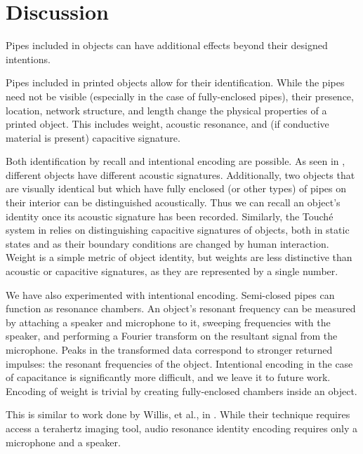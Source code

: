 \section{Discussion}

Pipes included in objects can have additional effects beyond their designed intentions.

Pipes included in printed objects allow for their identification.  While the pipes need not be visible (especially in the case of fully-enclosed pipes), their presence, location, network structure, and length change the physical properties of a printed object.  This includes weight, acoustic resonance, and (if conductive material is present) capacitive signature.

Both identification by recall and intentional encoding are possible.  As seen in \cite{Ono-touchandactivate}, different objects have different acoustic signatures.  Additionally, two objects that are visually identical but which have fully enclosed (or other types) of pipes on their interior can be distinguished acoustically.  Thus we can recall an object's identity once its acoustic signature has been recorded.  Similarly, the Touch\'{e} system in \cite{Sato-touche} relies on distinguishing capacitive signatures of objects, both in static states and as their boundary conditions are changed by human interaction.  Weight is a simple metric of object identity, but weights are less distinctive than acoustic or capacitive signatures, as they are represented by a single number.

We have also experimented with intentional encoding.  Semi-closed pipes can function as resonance chambers.  An object's resonant frequency can be measured by attaching a speaker and microphone to it, sweeping frequencies with the speaker, and performing a Fourier transform on the resultant signal from the microphone.  Peaks in the transformed data correspond to stronger returned impulses: the resonant frequencies of the object.  Intentional encoding in the case of capacitance is significantly more difficult, and we leave it to future work.  Encoding of weight is trivial by creating fully-enclosed chambers inside an object.

This is similar to work done by Willis, et al., in \cite{Willis-infrastructs}.  While their technique requires access a terahertz imaging tool, audio resonance identity encoding requires only a microphone and a speaker.

